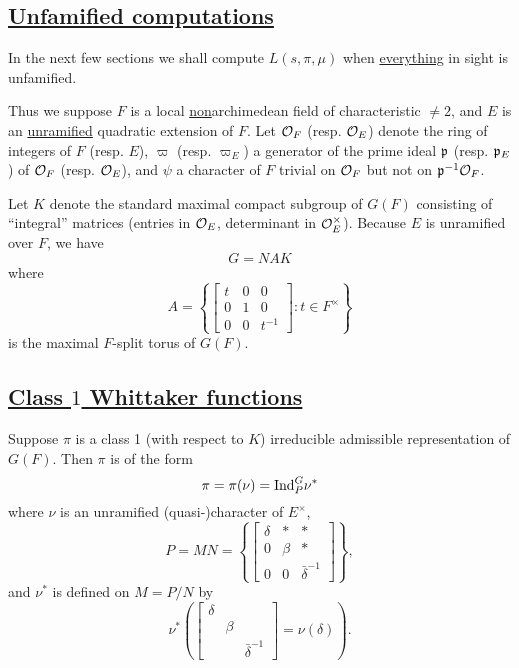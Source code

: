 \subsection{\underline{Unfamified computations}}
\label{sec:4.4}


In the next few sections we shall compute $L(s, \pi, \mu)$ when \underline{everything} in sight is unfamified.

Thus we suppose $F$ is a local \underline{non}archimedean field of characteristic $\neq 2$, and $E$ is an \underline{unramified} quadratic extension of $F$.
Let $\mathcal{O}_F$ (resp. $\mathcal{O}_E$) denote the ring of integers of $F$ (resp. $E$), $\varpi$ (resp. $\varpi_E$) a generator of the prime ideal $\mathfrak{p}$ (resp. $\mathfrak{p}_E$) of $\mathcal{O}_F$ (resp. $\mathcal{O}_E$), and $\psi$ a character of $F$ trivial on $\mathcal{O}_F$ but not on $\mathfrak{p}^{-1} \mathcal{O}_F$.

Let $K$ denote the standard maximal compact subgroup of $G(F)$ consisting of ``integral'' matrices (entries in $\mathcal{O}_E$, determinant in $\mathcal{O}_E^\times$).
Because $E$ is unramified over $F$, we have
\[
    G = NAK
\]
where
\[
    A = \left\{
        \begin{bmatrix}
            t & 0 & 0 \\ 0 & 1& 0 \\ 0 & 0 & t^{-1}
        \end{bmatrix}: t \in F^\times
    \right\}
\]
is the maximal $F$-split torus of $G(F)$.


\subsection{\underline{Class $1$ Whittaker functions}}
\label{sec:4.5}

Suppose $\pi$ is a class 1 (with respect to $K$) irreducible admissible representation of $G(F)$. Then $\pi$ is of the form
\[
    \pi = \pi(\nu) = \mathrm{Ind}_{P}^{G} \nu^*
\]
where $\nu$ is an unramified (quasi-)character of $E^\times$,
\[
    P = MN = \left\{
        \begin{bmatrix}
            \delta & * & * \\ 0 & \beta & * \\ 0 & 0 & \bar{\delta}^{-1}
        \end{bmatrix}
    \right\},
\]
and $\nu^*$ is defined on $M =P/N$ by
\[
    \nu^*\left(
        \begin{bmatrix}
            \delta & & \\ & \beta & \\ & & \bar{\delta}^{-1}
        \end{bmatrix} = \nu(\delta)
    \right).
\]

